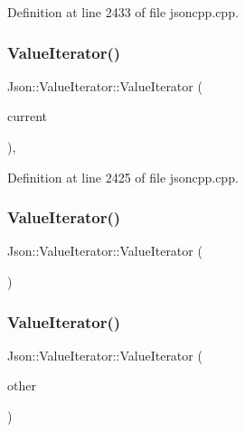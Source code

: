 Definition at line 2433 of file jsoncpp.\+cpp.

\hypertarget{class_json_1_1_value_iterator_afb06ea21add440c78c27dc49570460a5}{}\label{class_json_1_1_value_iterator_afb06ea21add440c78c27dc49570460a5} 
\subsubsection{\texorpdfstring{Value\+Iterator()}{ValueIterator()}\hspace{0.1cm}{\footnotesize\ttfamily [4/8]}}
{\footnotesize\ttfamily Json\+::\+Value\+Iterator\+::\+Value\+Iterator (\begin{DoxyParamCaption}\item[{const Value\+::\+Object\+Values\+::iterator \&}]{current }\end{DoxyParamCaption})\hspace{0.3cm}{\ttfamily [explicit]}, {\ttfamily [private]}}



Definition at line 2425 of file jsoncpp.\+cpp.

\hypertarget{class_json_1_1_value_iterator_a09425cf4dc12244072a942f290a5c0ec}{}\label{class_json_1_1_value_iterator_a09425cf4dc12244072a942f290a5c0ec} 
\subsubsection{\texorpdfstring{Value\+Iterator()}{ValueIterator()}\hspace{0.1cm}{\footnotesize\ttfamily [5/8]}}
{\footnotesize\ttfamily Json\+::\+Value\+Iterator\+::\+Value\+Iterator (\begin{DoxyParamCaption}{ }\end{DoxyParamCaption})}

\hypertarget{class_json_1_1_value_iterator_aa85aa208670891670392259efa0143bb}{}\label{class_json_1_1_value_iterator_aa85aa208670891670392259efa0143bb} 
\subsubsection{\texorpdfstring{Value\+Iterator()}{ValueIterator()}\hspace{0.1cm}{\footnotesize\ttfamily [6/8]}}
{\footnotesize\ttfamily Json\+::\+Value\+Iterator\+::\+Value\+Iterator (\begin{DoxyParamCaption}\item[{const \hyperlink{class_json_1_1_value_const_iterator}{Value\+Const\+Iterator} \&}]{other }\end{DoxyParamCaption})\hspace{0.3cm}{\ttfamily [explicit]}}

